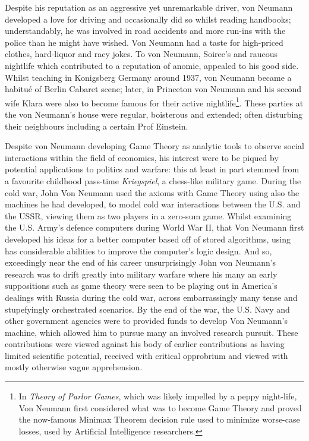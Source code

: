 \documentclass[7pt]{article}
\begin{document}
Despite his reputation as an aggressive yet unremarkable driver, von Neumann developed a love for driving and occasionally did so whilst reading handbooks; understandably, he was involved in road accidents and more run-ins with the police than he might have wished. Von Neumann had a taste for high-priced clothes, hard-liquor and racy jokes. To von Neumann, Soiree's and raucous nightlife which contributed to a reputation of anomie, appealed to his good side. Whilst teaching in Konigsberg Germany around 1937, von Neumann became a habitué of Berlin Cabaret scene; later, in Princeton von Neumann and his second wife Klara were also to become famous for their active nightlife\footnote{In \textit{Theory of Parlor Games}, which was likely impelled by a peppy night-life, Von Neumann first considered what was to become Game Theory and proved the now-famous Minimax Theorem decision rule used to minimize worse-case losses, used by Artificial Intelligence researchers.}. These parties at the von Neumann’s house were regular, boisterous and extended; often disturbing their neighbours including a certain Prof Einstein.

Despite von Neumann developing Game Theory as analytic tools to observe social interactions within the field of economics, his interest were to be piqued by potential applications to politics and warfare: this at least in part stemmed from a favourite childhood pass-time \textit{Kriegspiel}, a chess-like military game. During the cold war, John Von Neumann used the axioms with Game Theory  using also the machines he had developed, to model cold war interactions between the U.S. and the USSR, viewing them as two players in a zero-sum game. Whilst examining the U.S. Army's defence computers during World War II, that Von Neumann first developed his ideas for a better computer based off of stored algorithms, using has considerable abilities to improve the computer's logic design. And so, exceedingly near the end of his career unsurprisingly John von Neumann's research was to drift greatly into military warfare where his many an early suppositions such as game theory were seen to be playing out in America's dealings with Russia during the cold war, across embarrassingly many tense and stupefyingly orchestrated scenarios.  By the end of the war, the U.S. Navy and other government agencies were to provided funds to develop  Von Neumann's machine, which allowed him to pursue many an involved research pursuit. These contributions were viewed against his body of earlier contributions as having limited scientific potential, received with critical opprobrium and viewed with mostly otherwise vague apprehension.
\end{document}
